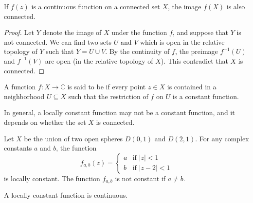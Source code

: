 \begin{svgraybox}
	\begin{theorem} \label{thm:connected_image_connected}
If $f(z)$ is a continuous function on a connected set $X$, the image $f(X)$ is also connected.
	\end{theorem}
\end{svgraybox}

\begin{proof}
Let $Y$ denote the image of $X$ under the function $f$, and suppose that $Y$ is not connected. We can find two sets $U$ and $V$ which is open in the relative topology of $Y$ such that $Y=U\cup V$. By the continuity of $f$, the preimage $f^{-1}(U)$ and $f^{-1}(V)$ are open (in the relative topology of $X$). This contradict that $X$ is connected.
\end{proof}

\begin{svgraybox}
	\begin{definition}
A function $f:X\rightarrow\mathbb{C}$ is said to be  if every point $z\in X$ is contained in a neighborhood $U \subseteq X$ such that the restriction of $f$ on $U$ is a constant function. \label{def:locally_constant_function}		
	\end{definition}
\end{svgraybox}
In general, a locally constant function may not be a constant function, and it depends on whether the set $X$ is connected.

\begin{example}
Let $X$ be the union of two open spheres $D(0,1)$ and $D(2,1)$. For any complex constants $a$ and $b$, the function
$$
f_{a,b}(z) = \begin{cases}
	a & \text{if } |z|<1 \\
	b & \text{if } |z-2|<1
\end{cases}
$$
is locally constant. The function $f_{a,b}$ is not constant if $a\neq b$. 
\end{example}

\begin{svgraybox}
	\begin{theorem}
		A locally constant function is continuous.
	\end{theorem}
\end{svgraybox}

